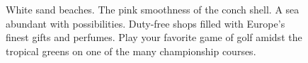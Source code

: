\documentclass{article}
\newcommand\exampletext{%
  White sand beaches. The pink smoothness of the conch shell. A sea abundant
  with possibilities. Duty-free shops filled with Europe's finest gifts and
  perfumes. Play your favorite game of golf amidst the tropical greens on one
  of the many championship courses.}
\begin{document}
\begin{figure}
\caption{\exampletext}
\end{figure}
\end{document}
